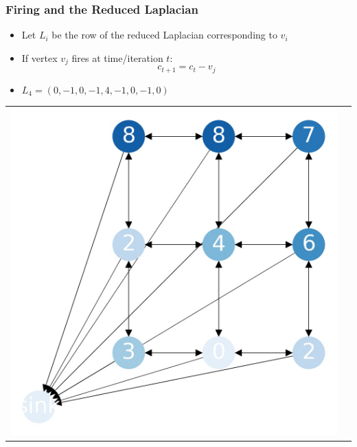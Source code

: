 \documentclass{beamer}
\begin{document}
\begin{frame}
\frametitle{Firing and the Reduced Laplacian}

\begin{itemize}
\item Let $L_i$ be the row of the reduced Laplacian corresponding to $v_i$
\item If vertex $v_j$ fires at time/iteration $t$:
\[ c_{t+1} = c_t - v_j \]
\item $L_4 = (0,-1,0,-1,4,-1,0,-1,0)$
\end{itemize}

\begin{tabular}{cc}

  \includegraphics[scale=0.15]{sandpile_12}


\end{tabular}
\end{frame}
\end{document}

